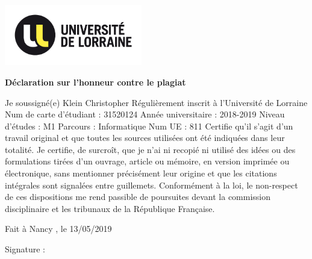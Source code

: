 \documentclass[11pt]{article}
\begin{document}
\cleardoublepage
\begin{flushleft}
\includegraphics[width=6cm]{UL_LOGO.jpg} %
\end{flushleft}

\vspace*{15mm}
\begin{center}
	{\bfseries \huge D\'{e}claration sur l'honneur contre le plagiat}
\end{center}
\vspace*{30mm}
Je soussign\'{e}(e) Klein Christopher
\newline
R\'{e}guli\`{e}rement inscrit \`{a} l'Universit\'{e} de Lorraine
\newline
Num de carte d'\'{e}tudiant : 31520124
\newline
Ann\'{e}e universitaire : 2018-2019
\newline
Niveau d'\'{e}tudes : M1
\newline
Parcours : Informatique
\newline
Num UE : 811
\newline
\newline
Certifie qu'il s'agit d'un travail original et que toutes les sources utilis\'{e}es ont \'{e}t\'{e} indiqu\'{e}es dans leur totalit\'{e}. Je certifie, de surcro\^{i}t, que je n'ai ni recopi\'{e} ni utilis\'{e} des id\'{e}es ou des formulations tir\'{e}es d'un ouvrage, article ou m\'{e}moire, en version imprim\'{e}e ou \'{e}lectronique, sans mentionner pr\'{e}cis\'{e}ment leur origine et que les citations int\'{e}grales sont signal\'{e}es entre guillemets.
\newline
\newline
Conform\'{e}ment \`{a} la loi, le non-respect de ces dispositions me rend passible de poursuites devant la commission disciplinaire et les tribunaux de la R\'{e}publique Fran\c{c}aise.
\vspace*{20mm}
\begin{center}
Fait \`{a}  Nancy , le 13/05/2019
\end{center}
\vspace*{15mm}
\begin{flushright}
 Signature :  \,\,\,\,\,\,\,\,\,\,\,\,\,\,\,\,\,\,\,\,\,\,\,\,\,\,\,\,\,\,\,\,\,\,\,\,\,\,\,\,\,\,\,\,\,\,
\end{flushright}
\end{document}
